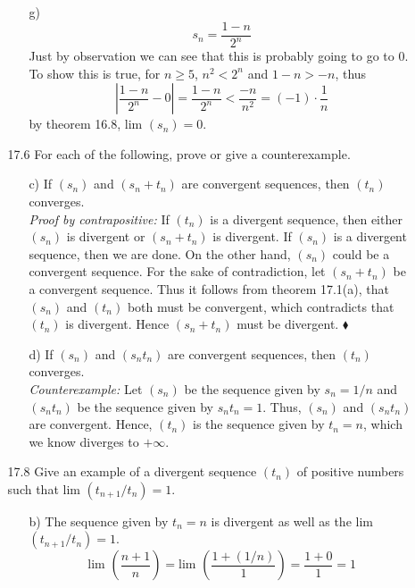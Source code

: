 \documentclass[12pt]{article}
\begin{document}
\begin{enumerate}
\begin{enumerate}
\begin{enumerate}
\item[g)] 
\[
s_n = \frac{1 - n}{2^n}
\]
Just by observation we can see that this is probably going to go to $0$. 
To show this is true, for $n \geq 5$, $n^2 < 2^n$ and $1 - n > -n$, thus
\[
\left| \frac{1 - n}{2^n} - 0 \right| = \frac{1 - n}{2^n} < \frac{-n}{n^2} = (-1) \cdot \frac{1}{n}
\]
by theorem 16.8, lim $(s_n) = 0$.

\end{enumerate}

\item[17.6] For each of the following, prove or give a counterexample.
\begin{enumerate}
\item[c)] If $(s_n)$ and $(s_n + t_n)$ are convergent sequences, then $(t_n)$ converges. \\
\emph{Proof by contrapositive:} If $(t_n)$ is a divergent sequence, then either $(s_n)$ is 
divergent or $(s_n + t_n)$ is divergent. If $(s_n)$ is a divergent sequence, then we are done.
On the other hand, $(s_n)$ could be a convergent sequence. For the sake of contradiction, let
$(s_n + t_n)$ be a convergent sequence. Thus it follows from theorem 17.1(a), that $(s_n)$ and
$(t_n)$ both must be convergent, which contradicts that $(t_n)$ is divergent. Hence
$(s_n + t_n)$ must be divergent. $\blacklozenge$

\item[d)] If $(s_n)$ and $(s_nt_n)$ are convergent sequences, then $(t_n)$ converges. \\
\emph{Counterexample:} Let $(s_n)$ be the sequence given by $s_n = 1/n$ 
and $(s_nt_n)$ be the sequence given by $s_nt_n = 1$. Thus, $(s_n)$ and $(s_nt_n)$
are convergent. Hence, $(t_n)$ is the sequence given by $t_n = n$, 
which we know diverges to $+\infty$.
\end{enumerate}

\item[17.8] Give an example of a divergent sequence $(t_n)$ of positive numbers such that lim $(t_{n+1}/t_n) = 1$.
\begin{enumerate}
\item[b)] The sequence given by $t_n = n$ is divergent as well as the lim $(t_{n+1}/t_n) = 1$.
\[
\mbox{lim } \left( \frac{n + 1}{n} \right) = \mbox{lim } \left( \frac{1 + (1/n)}{1} \right) =
\frac{1 + 0}{1} = 1
\]
\end{enumerate}


\end{enumerate}
\end{enumerate}
\end{document}
